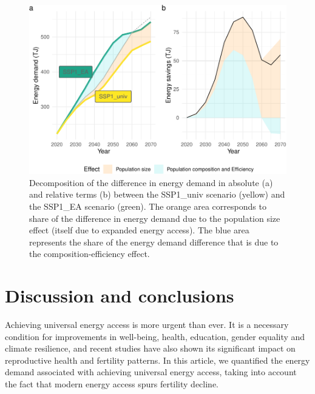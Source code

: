 \documentclass[
]{article}
\begin{document}
\begin{figure}
\centering
\includegraphics{../figures/energy-contrib-1.pdf}
\caption{\label{fig:energy-contrib}Decomposition of the difference in energy demand in absolute (a) and relative terms (b) between the SSP1\_univ scenario (yellow) and the SSP1\_EA scenario (green). The orange area corresponds to share of the difference in energy demand due to the population size effect (itself due to expanded energy access). The blue area represents the share of the energy demand difference that is due to the composition-efficiency effect.}
\end{figure}

\newpage

\hypertarget{discussion-and-conclusions}{%
\section{Discussion and conclusions}\label{discussion-and-conclusions}}

Achieving universal energy access is more urgent than ever. It is a necessary condition for improvements in well-being, health, education, gender equality and climate resilience, and recent studies have also shown its significant impact on reproductive health and fertility patterns. In this article, we quantified the energy demand associated with achieving universal energy access, taking into account the fact that modern energy access spurs fertility decline.
\end{document}
